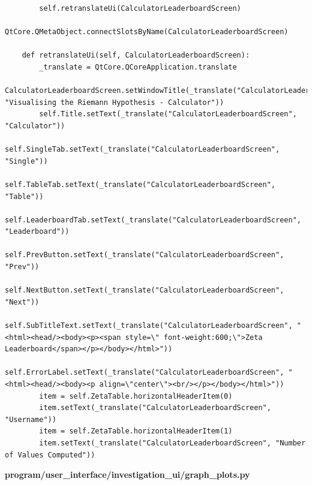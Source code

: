 \documentclass{article}
\begin{document}
\begin{lstlisting}
        self.retranslateUi(CalculatorLeaderboardScreen)
        QtCore.QMetaObject.connectSlotsByName(CalculatorLeaderboardScreen)

    def retranslateUi(self, CalculatorLeaderboardScreen):
        _translate = QtCore.QCoreApplication.translate
        CalculatorLeaderboardScreen.setWindowTitle(_translate("CalculatorLeaderboardScreen", "Visualising the Riemann Hypothesis - Calculator"))
        self.Title.setText(_translate("CalculatorLeaderboardScreen", "Calculator"))
        self.SingleTab.setText(_translate("CalculatorLeaderboardScreen", "Single"))
        self.TableTab.setText(_translate("CalculatorLeaderboardScreen", "Table"))
        self.LeaderboardTab.setText(_translate("CalculatorLeaderboardScreen", "Leaderboard"))
        self.PrevButton.setText(_translate("CalculatorLeaderboardScreen", "Prev"))
        self.NextButton.setText(_translate("CalculatorLeaderboardScreen", "Next"))
        self.SubTitleText.setText(_translate("CalculatorLeaderboardScreen", "<html><head/><body><p><span style=\" font-weight:600;\">Zeta Leaderboard</span></p></body></html>"))
        self.ErrorLabel.setText(_translate("CalculatorLeaderboardScreen", "<html><head/><body><p align=\"center\"><br/></p></body></html>"))
        item = self.ZetaTable.horizontalHeaderItem(0)
        item.setText(_translate("CalculatorLeaderboardScreen", "Username"))
        item = self.ZetaTable.horizontalHeaderItem(1)
        item.setText(_translate("CalculatorLeaderboardScreen", "Number of Values Computed"))
\end{lstlisting}


\textbf{program/user\_interface/investigation\_ui/graph\_plots.py}
\end{document}
